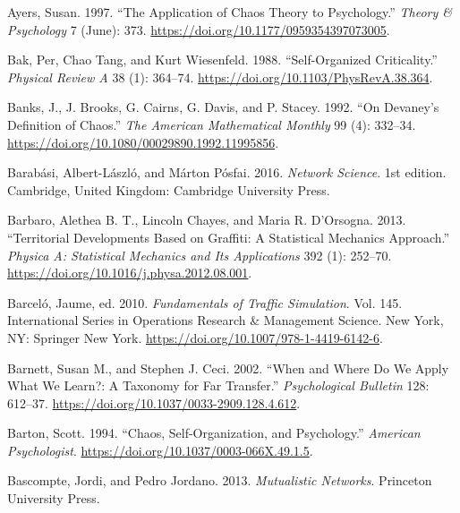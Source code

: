 \documentclass[
  a4paper,
  DIV=11,
  numbers=noendperiod,
  oneside]{scrreprt}
\newlength{\cslhangindent}
\newlength{\cslentryspacingunit} %
\newenvironment{CSLReferences}[2] %
 {%
  \setlength{\parindent}{0pt}
  \ifodd #1
  \let\oldpar\par
  \def\par{\hangindent=\cslhangindent\oldpar}
  \fi
  \setlength{\parskip}{#2\cslentryspacingunit}
 }%
 {}
\begin{document}
\begin{CSLReferences}{1}{0}
\leavevmode{}%
Ayers, Susan. 1997. {``The {Application} of {Chaos Theory} to
{Psychology}.''} \emph{Theory \& Psychology} 7 (June): 373.
\url{https://doi.org/10.1177/0959354397073005}.

\leavevmode{}%
Bak, Per, Chao Tang, and Kurt Wiesenfeld. 1988. {``Self-Organized
Criticality.''} \emph{Physical Review A} 38 (1): 364--74.
\url{https://doi.org/10.1103/PhysRevA.38.364}.

\leavevmode{}%
Banks, J., J. Brooks, G. Cairns, G. Davis, and P. Stacey. 1992. {``On
{Devaney}'s {Definition} of {Chaos}.''} \emph{The American Mathematical
Monthly} 99 (4): 332--34.
\url{https://doi.org/10.1080/00029890.1992.11995856}.

\leavevmode{}%
Barabási, Albert-László, and Márton Pósfai. 2016. \emph{Network
{Science}}. 1st edition. {Cambridge, United Kingdom}: {Cambridge
University Press}.

\leavevmode{}%
Barbaro, Alethea B. T., Lincoln Chayes, and Maria R. D'Orsogna. 2013.
{``Territorial Developments Based on Graffiti: {A} Statistical Mechanics
Approach.''} \emph{Physica A: Statistical Mechanics and Its
Applications} 392 (1): 252--70.
\url{https://doi.org/10.1016/j.physa.2012.08.001}.

\leavevmode{}%
Barceló, Jaume, ed. 2010. \emph{Fundamentals of {Traffic Simulation}}.
Vol. 145. International {Series} in {Operations Research} \& {Management
Science}. {New York, NY}: {Springer New York}.
\url{https://doi.org/10.1007/978-1-4419-6142-6}.

\leavevmode{}%
Barnett, Susan M., and Stephen J. Ceci. 2002. {``When and Where Do We
Apply What We Learn?: {A} Taxonomy for Far Transfer.''}
\emph{Psychological Bulletin} 128: 612--37.
\url{https://doi.org/10.1037/0033-2909.128.4.612}.

\leavevmode{}%
Barton, Scott. 1994. {``Chaos, {Self-Organization}, and {Psychology}.''}
\emph{American Psychologist}.
\url{https://doi.org/10.1037/0003-066X.49.1.5}.

\leavevmode{}%
Bascompte, Jordi, and Pedro Jordano. 2013. \emph{Mutualistic
{Networks}}. {Princeton University Press}.


\end{CSLReferences}
\end{document}
